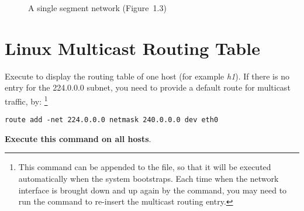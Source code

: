 \documentclass{../UTNetLab}
\begin{document}
    \begin{minipage}{0.48\textwidth}
        \begin{flushright}
            \begin{figure}[H]
                \centering
                \caption{A single segment network (Figure~1.3)}
                \label{fig:1.3}
            \end{figure}
        \end{flushright}
    \end{minipage}

\section{Linux Multicast Routing Table}
\label{sec:linux-multicast-routing}
    Execute  to display the routing table of one host (for example \textit{h1}).
    If there is no entry for the 224.0.0.0 subnet, you need to provide a default route for multicast traffic, by:
    \footnote{This command can be appended to the  file, so that it will be executed automatically when the system bootstraps.
    Each time when the network interface is brought down and up again by the  command, you may need to run the  command to re-insert the multicast routing entry.}
    \begin{lstlisting}[emph=eth0,morekeywords={[3]add,netmask,dev}]
route add -net 224.0.0.0 netmask 240.0.0.0 dev eth0
    \end{lstlisting}
    \textbf{Execute this command on all hosts}.
\end{document}
